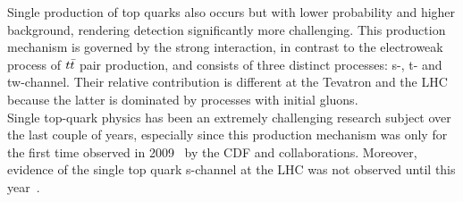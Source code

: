 Single production of top quarks also occurs but with lower probability and higher background, rendering detection significantly more challenging.
This production mechanism is governed by the strong interaction, in contrast to the electroweak process of $t\bar{t}$ pair production, and consists of three distinct processes: s-, t- and tw-channel.
Their relative contribution is different at the Tevatron and the LHC because the latter is dominated by processes with initial gluons. %
\\
Single top-quark physics has been an extremely challenging research subject over the last couple of years, especially since this production mechanism was only for the first time observed in 2009~\cite{STDiscovery1, STDiscovery2} by the CDF and \DZ collaborations. Moreover, evidence of the single top quark s-channel at the LHC was not observed until this year~\cite{AtlasSTsChEvidence}.
